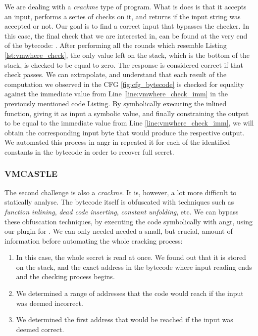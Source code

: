 We are dealing with a \emph{crackme} type of program. What is does is that it accepts an input, performs a series of checks on it, and returns if the input string was accepted or not. Our goal is to find a correct input that bypasses the checker. In this case, the final check that we are interested in, can be found at the very end of the bytecode: . After performing all the rounds which resemble Listing \ref{lst:vmwhere_check}, the only value left on the stack, which is the bottom of the stack, is checked to be equal to zero. The response is considered correct if that check passes. We can extrapolate, and understand that each result of the computation we observed in the \gls{CFG} \ref{fig:cfg_bytecode} is checked for equality against the immediate value from Line \ref{line:vmwhere_check_imm} in the previously mentioned code Listing. By symbolically executing the inlined function, giving it as input a symbolic value, and finally constraining the output to be equal to the immediate value \cc{\xZZ} from Line \ref{line:vmwhere_check_imm}, we will obtain the corresponding input byte that would produce the respective output. We automated this process in angr in repeated it for each of the identified constants in the bytecode in order to recover full secret. %

\subsubsection{VMCASTLE}

The second challenge is also a \emph{crackme}. It is, however, a lot more difficult to statically analyse. The bytecode itself is obfuscated with techniques such as \emph{function inlining}, \emph{dead code inserting}, \emph{constant unfolding}, etc. We can bypass these obfuscation techniques, by executing the code symbolically with angr, using our plugin for . We can only needed needed a small, but crucial, amount of information before automating the whole cracking process:

\begin{enumerate}
    \item In this case, the whole secret is read at once. We found out that it is stored on the stack, and the exact address in the bytecode where input reading ends and the checking process begins. \label{item:one}
    \item We determined a range of addresses that the code would reach if the input was deemed incorrect. \label{item:two}
    \item We determined the first address that would be reached if the input was deemed correct. \label{item:three}
\end{enumerate}

